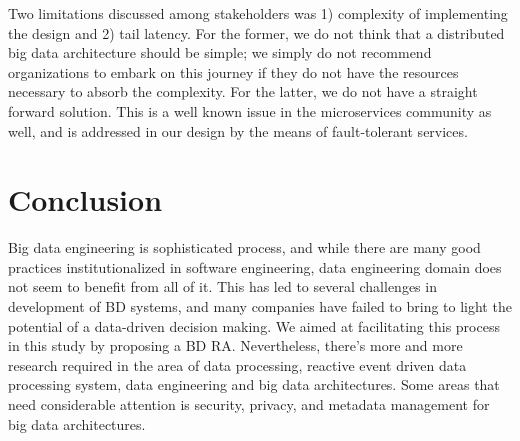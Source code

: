 \documentclass[runningheads]{llncs}
\begin{document}

 
 Two limitations discussed among stakeholders was 1) complexity of implementing the design and 2) tail latency. For the former, we do not think that a distributed big data architecture should be simple; we simply do not recommend organizations to embark on this journey if they do not have the resources necessary to absorb the complexity. For the latter, we do not have a straight forward solution. This is a well known issue in the microservices community as well, and is addressed in our design by the means of fault-tolerant services.  
 
 


 \section{Conclusion}
  
 Big data engineering is sophisticated process, and while there are many good practices institutionalized in software engineering, data engineering domain does not seem to benefit from all of it. This has led to several challenges in development of BD systems, and many companies have failed to bring to light the potential of a data-driven decision making. We aimed at facilitating this process in this study by proposing a BD RA. Nevertheless, there's more and more research required in the area of data processing, reactive event driven data processing system, data engineering and big data architectures. Some areas that need considerable attention is security, privacy, and metadata management for big data architectures.

%
%



\end{document}
